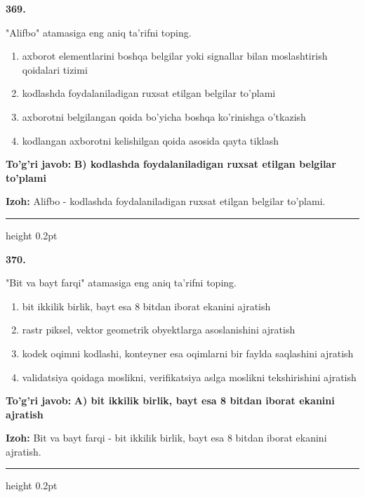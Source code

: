 \documentclass[10pt,a4paper,oneside]{article}
\begin{document}
\noindent\textbf{\color{ink}369.}
\par
"Alifbo" atamasiga eng aniq ta'rifni toping.
\begin{enumerate}[label=\Alph*),leftmargin=9mm]
\item axborot elementlarini boshqa belgilar yoki signallar bilan moslashtirish qoidalari tizimi
\item kodlashda foydalaniladigan ruxsat etilgan belgilar to'plami
\item axborotni belgilangan qoida bo'yicha boshqa ko'rinishga o'tkazish
\item kodlangan axborotni kelishilgan qoida asosida qayta tiklash
\end{enumerate}
\begin{tcolorbox}[enhanced,breakable,colback=teal!4,colframe=teal!50!black,boxrule=0.5pt,arc=1.1mm,left=3mm,right=3mm,top=1.7mm,bottom=1.7mm,before skip=2mm,after skip=2mm]
\textbf{\color{teal}To'g'ri javob:} \textbf{B) kodlashda foydalaniladigan ruxsat etilgan belgilar to'plami}
\par\smallskip
\textbf{Izoh:} Alifbo - kodlashda foydalaniladigan ruxsat etilgan belgilar to'plami.
\end{tcolorbox}
\vspace{2mm}\hrule height 0.2pt \vspace{3mm}

\noindent\textbf{\color{ink}370.}
\par
"Bit va bayt farqi" atamasiga eng aniq ta'rifni toping.
\begin{enumerate}[label=\Alph*),leftmargin=9mm]
\item bit ikkilik birlik, bayt esa 8 bitdan iborat ekanini ajratish
\item rastr piksel, vektor geometrik obyektlarga asoslanishini ajratish
\item kodek oqimni kodlashi, konteyner esa oqimlarni bir faylda saqlashini ajratish
\item validatsiya qoidaga moslikni, verifikatsiya aslga moslikni tekshirishini ajratish
\end{enumerate}
\begin{tcolorbox}[enhanced,breakable,colback=teal!4,colframe=teal!50!black,boxrule=0.5pt,arc=1.1mm,left=3mm,right=3mm,top=1.7mm,bottom=1.7mm,before skip=2mm,after skip=2mm]
\textbf{\color{teal}To'g'ri javob:} \textbf{A) bit ikkilik birlik, bayt esa 8 bitdan iborat ekanini ajratish}
\par\smallskip
\textbf{Izoh:} Bit va bayt farqi - bit ikkilik birlik, bayt esa 8 bitdan iborat ekanini ajratish.
\end{tcolorbox}
\vspace{2mm}\hrule height 0.2pt \vspace{3mm}
\end{document}
